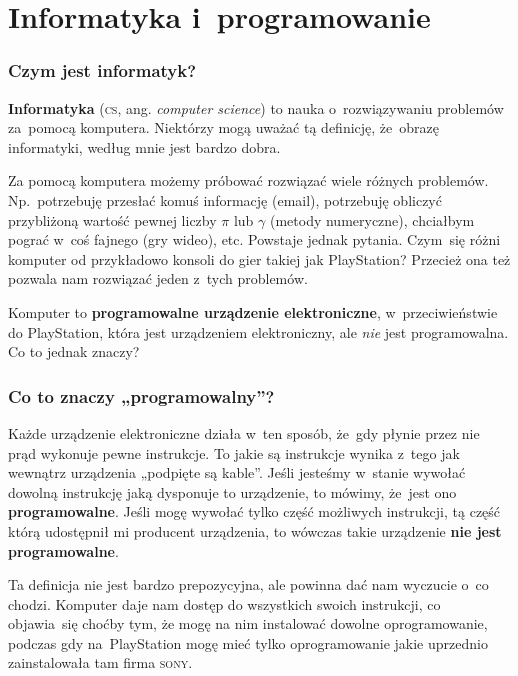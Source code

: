 \documentclass[10pt,t]{beamer}
\begin{document}
\section{Informatyka i~programowanie}



\begin{frame}
  \frametitle{Czym jest informatyk?}


  \textbf{Informatyka} (\textsc{cs}, ang. \textit{computer science}) to
  nauka o~rozwiązywaniu problemów za~pomocą komputera. Niektórzy mogą
  uważać tą definicję, że~obrazę informatyki, według mnie jest bardzo dobra.

  Za pomocą komputera możemy próbować rozwiązać wiele różnych problemów.
  Np.~potrzebuję przesłać komuś informację (email), potrzebuję obliczyć
  przybliżoną wartość pewnej liczby $\pi$ lub $\gamma$ (metody numeryczne),
  chciałbym pograć w~coś fajnego (gry wideo), etc. Powstaje jednak pytania.
  Czym~się różni komputer od przykładowo konsoli do gier takiej jak
  PlayStation? Przecież ona też pozwala nam rozwiązać jeden z~tych
  problemów.

  Komputer to \textbf{programowalne urządzenie elektroniczne},
  w~przeciwieństwie do PlayStation, która jest urządzeniem elektroniczny,
  ale \textit{nie} jest programowalna. Co to jednak znaczy?

\end{frame}





\begin{frame}
  \frametitle{Co to znaczy „programowalny”?}


  Każde urządzenie elektroniczne działa w~ten sposób, że~gdy płynie przez
  nie prąd wykonuje pewne instrukcje. To jakie są instrukcje wynika
  z~tego jak wewnątrz urządzenia „podpięte są kable”. Jeśli jesteśmy
  w~stanie wywołać dowolną instrukcję jaką dysponuje to urządzenie, to
  mówimy, że~jest ono \textbf{programowalne}. Jeśli mogę wywołać tylko
  część możliwych instrukcji, tą część którą udostępnił mi producent
  urządzenia, to wówczas takie urządzenie \textbf{nie jest programowalne}.

  Ta definicja nie jest bardzo prepozycyjna, ale powinna dać nam wyczucie
  o~co chodzi. Komputer daje nam dostęp do wszystkich swoich instrukcji,
  co objawia~się choćby tym, że mogę na nim instalować dowolne
  oprogramowanie, podczas gdy na~PlayStation mogę mieć tylko oprogramowanie
  jakie uprzednio zainstalowała tam firma \textsc{sony}.

\end{frame}
\end{document}
